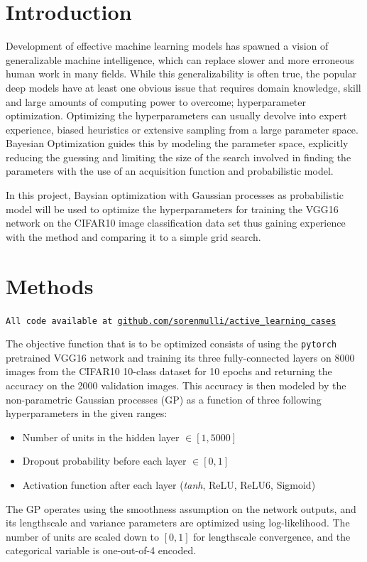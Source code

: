 \documentclass[12pt,fleqn]{article}
\begin{document}
\begin{multicols}{2}


\section{Introduction} 
Development of effective machine learning models has spawned a vision of generalizable machine intelligence, which can replace slower and more erroneous human work in many fields. While this generalizability is often true, the popular deep models have at least one obvious issue that requires domain knowledge, skill and large amounts of computing power to overcome; hyperparameter optimization. Optimizing the hyperparameters can usually devolve into expert experience, biased heuristics or extensive sampling from a large parameter space. Bayesian Optimization guides this by modeling the parameter space, explicitly reducing the guessing and limiting the size of the search involved in finding the parameters with the use of an acquisition function and probabilistic model.

In this project, Baysian optimization with Gaussian processes as probabilistic model will be used to optimize the hyperparameters for training the VGG16 network on the CIFAR10 image classification data set thus gaining experience with the method and comparing it to a simple grid search.
\vspace*{-0.3cm}
\section{Methods}
\vspace*{-0.2cm}
\texttt{All code available at \url{github.com/sorenmulli/active_learning_cases}}

The objective function that is to be optimized consists of using the \texttt{pytorch} pretrained VGG16 network \cite{vgg} and training its three fully-connected layers on 8000 images from the CIFAR10 10-class dataset \cite{cifar10} for 10 epochs and returning the accuracy on the 2000 validation images. 
This accuracy is then modeled by the non-parametric Gaussian processes (GP) as a function of three following hyperparameters in the given ranges:
\vspace*{-0.05cm}
\begin{itemize}
	\item Number of units in the hidden layer \(\in [1, 5000]\) 
	\item Dropout probability before each layer \(\in [0,1]\)
	\item Activation function after each layer (\textit{tanh}, ReLU, ReLU6, Sigmoid)
\end{itemize}
The GP operates using the smoothness assumption on the network outputs, and its lengthscale and variance parameters are optimized using log-likelihood. The number of units are scaled down to \([0,1]\) for lengthscale convergence, and the categorical variable is one-out-of-4 encoded. 


\end{multicols}
\end{document}

